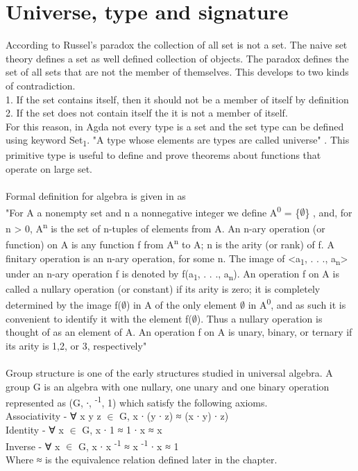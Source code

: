 \section{Universe, type and signature}
According to Russel's paradox \cite{russell2020principles} the collection of all set is not a set. The naive set theory defines a set as well defined collection of objects. The paradox defines the set of all sets that are not the member of themselves. This develops to two kinds of contradiction. \cite{russelPara}\\
1. If the set contains itself, then it should not be a member of itself by definition\\
2. If the set does not contain itself the it is not a member of itself.\\
For this reason, in Agda not every type is a set and the set type can be defined using keyword Set\textsubscript{1}. "A type whose elements are types are called universe" \cite{universeagda}. This primitive type is useful to define and prove theorems about functions that operate on large set.\\
\\
Formal definition for algebra is given in \cite{sankappanavar1981course} as \\ "For A a nonempty set and n a nonnegative integer we define A\textsuperscript{0} = \{\(\emptyset\)\} , and, for n > 0, A\textsuperscript{n} is the set of n-tuples of elements from A. An n-ary operation (or function) on A is any function f from A\textsuperscript{n} to A; n is the arity (or rank) of f. A finitary operation is an n-ary operation, for some n. The image of <a\textsubscript{1}, . . ., a\textsubscript{n}> under an n-ary operation f is denoted by f(a\textsubscript{1}, . . ., a\textsubscript{n}). An operation f on A is called a nullary operation (or constant) if its arity is zero; it is completely determined by the image f(\(\emptyset\)) in A of the only element \(\emptyset\) in A\textsuperscript{0}, and as such it is convenient to identify it with the element f(\(\emptyset\)). Thus a nullary operation is thought of as an element of A. An operation f on A is unary, binary, or ternary if its arity is 1,2, or 3, respectively"\\ \\
Group structure is one of the early structures studied in universal algebra. A group G is an algebra with one nullary, one unary and one binary operation represented as (G, ∙, \textsuperscript{-1}, 1) which satisfy the following axioms. \\
Associativity - ∀ x y z \(\in\) G, x ∙ (y ∙ z) ≈ (x ∙ y) ∙ z)\\
Identity - ∀ x \(\in\) G, x ∙ 1 ≈ 1 ∙ x ≈ x\\
Inverse - ∀ x \(\in\) G, x ∙ x \textsuperscript{-1} ≈  x \textsuperscript{-1} ∙ x ≈ 1\\
Where ≈ is the equivalence relation defined later in the chapter.\\

